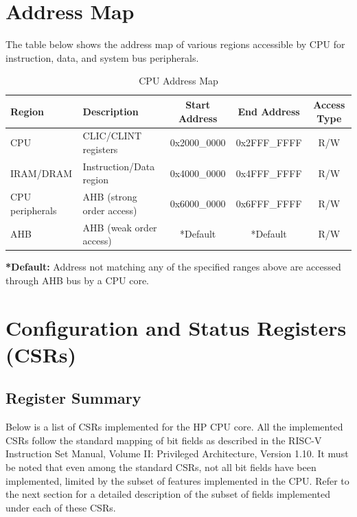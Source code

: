\documentclass[main\_\_EN.tex]{subfiles}
\begin{document}
\section{Address Map}
The table below shows the address map of various regions accessible by CPU for instruction, data, and system bus peripherals.

\begin{longtable}{| l| l |c | c | c  |}
\caption{CPU Address Map} \label{tab:riscvcpu-mem-blocks}
\\ \hline
\rowcolor{lightgray}
\textbf{Region} & \textbf{Description}    & \textbf{Start Address}  & \textbf{End Address}  & \textbf{Access Type}   \\ \hline
CPU \label{cpu} &  CLIC/CLINT registers &      0x2000\_0000  &  0x2FFF\_FFFF  &  R/W  \\ \hline
IRAM/DRAM\label{ram} & Instruction/Data region &   0x4000\_0000  &  0x4FFF\_FFFF  &  R/W  \\ \hline
CPU peripherals \label{cpu_peri} & AHB (strong order access)  &      0x6000\_0000  &  0x6FFF\_FFFF  &  R/W  \\ \hline
AHB\label{sysahb} & AHB (weak order access) &      *Default  &  *Default  &  R/W  \\ \hline
\end{longtable}

\textbf{*Default:} Address not matching any of the specified ranges above are accessed through AHB bus by a CPU core.


\section{Configuration and Status Registers (CSRs)}
\hypertarget{riscvcpu-cpu-reg-summ}{}
\subsection{Register Summary}
\label{sec:riscvcpu-cpu-reg-summ}

Below is a list of CSRs implemented for the HP CPU core. All the implemented CSRs follow the standard mapping of bit fields as described in the RISC-V Instruction Set Manual, Volume II: Privileged Architecture, Version 1.10. It must be noted that even among the standard CSRs, not all bit fields have been implemented, limited by the subset of features implemented in the CPU. Refer to the next section for a detailed description of the subset of fields implemented under each of these CSRs.
\end{document}
